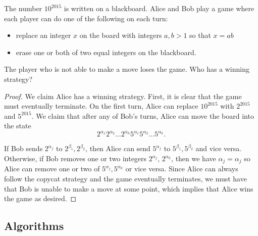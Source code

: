 \documentclass[11pt]{article}
\renewcommand{\>}{\rangle}
\newcommand{\<}{\langle}
\begin{document}
\begin{problem} The number $10^{2015}$ is written on a blackboard.  Alice and Bob play a game where each player can do one of the following on each turn:
\begin{itemize}
\item replace an integer $x$ on the board with integers $a, b > 1$ so that $x = ab$
\item erase one or both of two equal integers on the blackboard.  
\end{itemize}
The player who is not able to make a move loses the game.  Who has a winning strategy?
\end{problem}
\begin{proof}
We claim Alice has a winning strategy.  First, it is clear that the game must eventually terminate.  On the first turn, Alice can replace $10^{2015}$ with $2^{2015}$ and $5^{2015}$.  We claim that after any of Bob's turns, Alice can move the board into the state 
$$2^{\alpha_1} 2^{\alpha_2} \dots 2^{\alpha_k} 5^{\alpha_1} 5^{\alpha_2} \dots 5^{\alpha_k}.$$

If Bob sends $2^{\alpha_j}$ to $2^{\beta_1} ,2^{\beta_2}$, then Alice can send $5^{\alpha_j}$ to $5^{\beta_1} , 5^{\beta_2}$ and vice versa.  Otherwise, if Bob removes one or two integers $2^{\alpha_j}$, $2^{\alpha_k}$, then we have $\alpha_j = \alpha_j$ so Alice can remove one or two of $5^{\alpha_j}, 5^{\alpha_k}$ or vice versa.  Since Alice can always follow the copycat strategy and the game eventually terminates, we must have that Bob is unable to make a move at some point, which implies that Alice wins the game as desired.   
\end{proof}

\begin{problem}


\end{problem}
\subsection{Algorithms}
\end{document}
